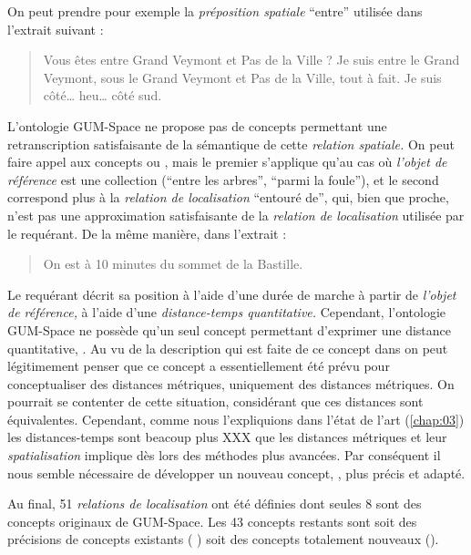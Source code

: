 On peut prendre pour exemple la \emph{préposition spatiale}
\enquote{entre} utilisée dans l'extrait suivant :
%
\begin{quote}
  \begin{dialogue}
    \Sec Vous êtes entre Grand Veymont et Pas de la Ville ?  \Req Je
    suis entre le Grand Veymont, sous le Grand Veymont et Pas de la
    Ville, tout à fait. Je suis côté… heu… côté sud.
  \end{dialogue}
\end{quote}
%
L'ontologie GUM-Space ne propose pas de concepts permettant une
retranscription satisfaisante de la sémantique de cette \emph{relation
  spatiale.} On peut faire appel aux concepts
 ou , mais le
premier s'applique qu'au cas où \emph{l'objet de référence} est une
collection (\eg \enquote{entre les arbres}, \enquote{parmi la foule}),
et le second correspond plus à la \emph{relation de localisation}
\enquote{entouré de}, qui, bien que proche, n'est pas une
approximation satisfaisante de la \emph{relation de localisation}
utilisée par le requérant. De la même manière, dans l'extrait :
%
\begin{quote}
  \begin{dialogue}
    \Req On est à 10 minutes du sommet de la Bastille.
  \end{dialogue}
\end{quote}
%
Le requérant décrit sa position à l'aide d'une durée de marche à
partir de \emph{l'objet de référence,} \ie à l'aide d'une
\emph{distance-temps quantitative.} Cependant, l'ontologie GUM-Space
ne possède qu'un seul concept permettant d'exprimer une distance
quantitative, . Au vu de la
description qui est faite de ce concept dans \textcite{Bateman2010} on
peut légitimement penser que ce concept a essentiellement été prévu
pour conceptualiser des distances métriques, uniquement des distances
métriques. On pourrait se contenter de cette situation, considérant
que ces distances sont équivalentes. Cependant, comme nous
l'expliquions dans l'état de l'art (\autoref{chap:03}) les
distances-temps sont beacoup plus XXX que les distances métriques et
leur \emph{spatialisation} implique dès lors des méthodes plus
avancées. Par conséquent il nous semble nécessaire de développer un
nouveau concept, , plus précis et adapté.

Au final, 51 \emph{relations de localisation} ont été définies dont
seules 8 sont des concepts originaux de GUM-Space. Les 43 concepts
restants sont soit des précisions de concepts existants (\eg
{}) soit des concepts totalement nouveaux
(\eg {}).

